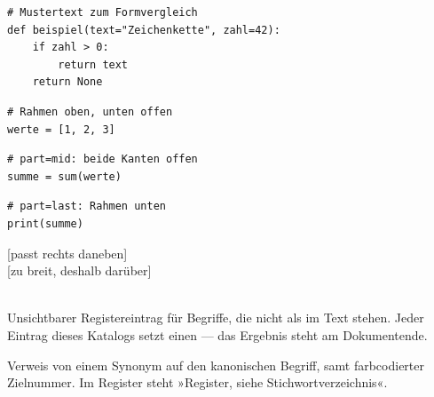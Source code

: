 \begin{codebox}[H-04 · codebox]
\begin{lstlisting}[style=CodeExpert]
# Mustertext zum Formvergleich
def beispiel(text="Zeichenkette", zahl=42):
    if zahl > 0:
        return text
    return None
\end{lstlisting}
\end{codebox}

\begin{codebox}[H-05 · part=first][part=first]
\begin{lstlisting}[style=CodeExpert]
# Rahmen oben, unten offen
werte = [1, 2, 3]
\end{lstlisting}
\end{codebox}
\begin{codebox}[][part=mid]
\begin{lstlisting}[style=CodeExpert]
# part=mid: beide Kanten offen
summe = sum(werte)
\end{lstlisting}
\end{codebox}
\begin{codebox}[][part=last]
\begin{lstlisting}[style=CodeExpert]
# part=last: Rahmen unten
print(summe)
\end{lstlisting}
\end{codebox}


\begin{defbox}[H-06 · CodeLine][weight=quiet]
  \ttfamily
  [passt rechts daneben]\\
  [zu breit, deshalb darüber]\\
  \\
\end{defbox}


\begin{defbox}[H-09 · ZSFindex][weight=quiet]
  Unsichtbarer Registereintrag für Begriffe, die nicht als
   im Text stehen. Jeder Eintrag dieses Katalogs
  setzt einen — das Ergebnis steht am Dokumentende.
\end{defbox}

\begin{defbox}[H-10 · ZSFindexsee][weight=quiet]
  Verweis von einem Synonym auf den kanonischen Begriff, samt farbcodierter
  Zielnummer. Im Register steht »Register, siehe Stichwortverzeichnis«.
\end{defbox}
